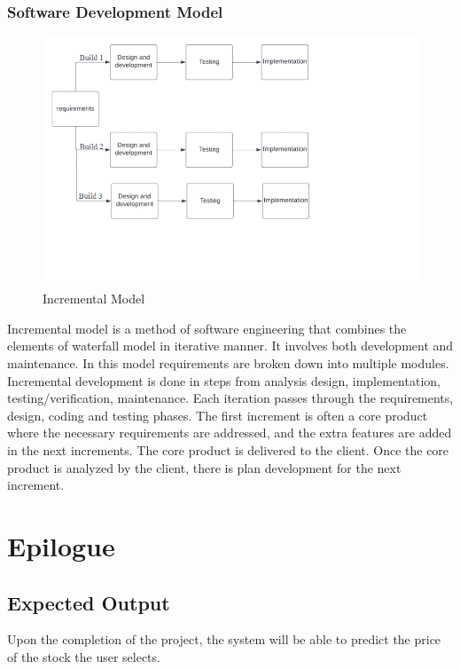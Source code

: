 \subsection{Software Development Model}
\vspace{-18pt}
 \begin{figure}[tbh] %
\begin{center}
	\includegraphics[width=8in]{images/sdlc1.png} 
	\caption{Incremental Model} %
	\label{Incremental Model} %
\end{center}
\end{figure}
 Incremental model is a method of software engineering that combines the elements of waterfall model in iterative manner. It involves both development and maintenance. In this model requirements are broken down into multiple modules. Incremental development is done in steps from analysis design, implementation, testing/verification, maintenance. Each iteration passes through the requirements, design, coding and testing phases. The first increment is often a core product where the necessary requirements are addressed, and the extra features are added in the next increments. The core product is delivered to the client. Once the core product is analyzed by the client, there is plan development for the next increment.\\
\chapter{Epilogue}
\vspace{-18pt}
\section{Expected Output}
\vspace{-18pt}
Upon the completion of the project, the system will be able to predict the price of the stock the user selects.

\renewcommand\bibname{REFERENCES} %

